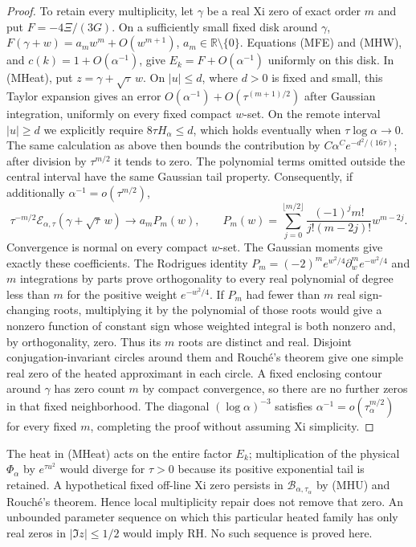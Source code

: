 \documentclass[11pt]{article}
\theoremstyle{remark}\newtheorem{remark}[theorem]{Remark}
\newcommand{\R}{\mathbb R}
\begin{document}
\begin{proof}
To retain every multiplicity, let $\gamma$ be a real Xi zero of
exact order $m$ and put $F=-4\Xi/(3G)$. On a sufficiently small
fixed disk around $\gamma$,
$F(\gamma+w)=a_mw^m+O(w^{m+1})$, $a_m\in\R\setminus\{0\}$.
Equations (MFE) and (MHW), and $c(k)=1+O(\alpha^{-1})$, give
$E_k=F+O(\alpha^{-1})$ uniformly on this disk.
In (MHeat), put $z=\gamma+\sqrt\tau\,w$. On $|u|\le d$,
where $d>0$ is fixed and small, this Taylor expansion gives an
error $O(\alpha^{-1})+O(\tau^{(m+1)/2})$ after Gaussian integration,
uniformly on every fixed compact $w$-set. On the remote interval
$|u|\ge d$ we explicitly require $8\tau H_\alpha\le d$,
which holds eventually when $\tau\log\alpha\to0$.
The same calculation as above then bounds the contribution by
$C\alpha^C e^{-d^2/(16\tau)}$; after division by $\tau^{m/2}$
it tends to zero. The polynomial terms omitted outside the
central interval have the same Gaussian tail property.
Consequently, if additionally $\alpha^{-1}=o(\tau^{m/2})$,
\[
 \tau^{-m/2}\mathcal E_{\alpha,\tau}
        (\gamma+\sqrt\tau\,w)\longrightarrow a_mP_m(w),\qquad
 P_m(w)=\sum_{j=0}^{\lfloor m/2\rfloor}
       \frac{(-1)^jm!}{j!(m-2j)!}w^{m-2j}. \tag{MHH}
\]
Convergence is normal on every compact $w$-set.
The Gaussian moments give exactly these coefficients.
The Rodrigues identity
$P_m=(-2)^me^{w^2/4}\partial_w^me^{-w^2/4}$ and $m$ integrations
by parts prove orthogonality to every real polynomial of degree
less than $m$ for the positive weight $e^{-w^2/4}$.
If $P_m$ had fewer than $m$ real sign-changing roots, multiplying
it by the polynomial of those roots would give a nonzero function
of constant sign whose weighted integral is both nonzero and,
by orthogonality, zero. Thus its $m$ roots are distinct and real.
Disjoint conjugation-invariant circles around them and Rouch\'e's
theorem give one simple real zero of the heated approximant in
each circle. A fixed enclosing contour around $\gamma$ has zero
count $m$ by compact convergence, so there are no further zeros
in that fixed neighborhood. The diagonal $(\log\alpha)^{-3}$
satisfies $\alpha^{-1}=o(\tau_\alpha^{m/2})$ for every fixed $m$,
completing the proof without assuming Xi simplicity.
\end{proof}

The heat in (MHeat) acts on the entire factor $E_k$; multiplication
of the physical $\Phi_\alpha$ by $e^{\tau u^2}$ would diverge for
$\tau>0$ because its positive exponential tail is retained.
A hypothetical fixed off-line Xi zero persists in
$\mathcal B_{\alpha,\tau_\alpha}$ by (MHU) and Rouch\'e's theorem.
Hence local multiplicity repair does not remove that zero.
An unbounded parameter sequence on which this particular heated
family has only real zeros in $|\Im z|\le1/2$ would imply RH.
No such sequence is proved here.
\end{document}
